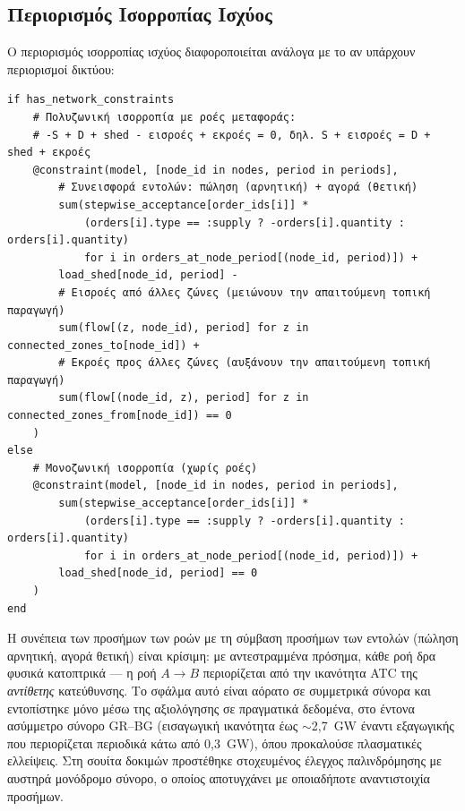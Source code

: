\subsection{Περιορισμός Ισορροπίας Ισχύος}
\label{subsec:mpcc-power-balance}

Ο περιορισμός ισορροπίας ισχύος διαφοροποιείται ανάλογα με το αν υπάρχουν περιορισμοί δικτύου:

\begin{samepage}
\begin{verbatim}
if has_network_constraints
    # Πολυζωνική ισορροπία με ροές μεταφοράς:
    # -S + D + shed - εισροές + εκροές = 0, δηλ. S + εισροές = D + shed + εκροές
    @constraint(model, [node_id in nodes, period in periods],
        # Συνεισφορά εντολών: πώληση (αρνητική) + αγορά (θετική)
        sum(stepwise_acceptance[order_ids[i]] *
            (orders[i].type == :supply ? -orders[i].quantity : orders[i].quantity)
            for i in orders_at_node_period[(node_id, period)]) +
        load_shed[node_id, period] -
        # Εισροές από άλλες ζώνες (μειώνουν την απαιτούμενη τοπική παραγωγή)
        sum(flow[(z, node_id), period] for z in connected_zones_to[node_id]) +
        # Εκροές προς άλλες ζώνες (αυξάνουν την απαιτούμενη τοπική παραγωγή)
        sum(flow[(node_id, z), period] for z in connected_zones_from[node_id]) == 0
    )
else
    # Μονοζωνική ισορροπία (χωρίς ροές)
    @constraint(model, [node_id in nodes, period in periods],
        sum(stepwise_acceptance[order_ids[i]] *
            (orders[i].type == :supply ? -orders[i].quantity : orders[i].quantity)
            for i in orders_at_node_period[(node_id, period)]) +
        load_shed[node_id, period] == 0
    )
end
\end{verbatim}
\end{samepage}

Η συνέπεια των προσήμων των ροών με τη σύμβαση προσήμων των εντολών (πώληση αρνητική, αγορά θετική) είναι κρίσιμη: με αντεστραμμένα πρόσημα, κάθε ροή δρα φυσικά κατοπτρικά --- η ροή $A \to B$ περιορίζεται από την ικανότητα ATC της \emph{αντίθετης} κατεύθυνσης. Το σφάλμα αυτό είναι αόρατο σε συμμετρικά σύνορα και εντοπίστηκε μόνο μέσω της αξιολόγησης σε πραγματικά δεδομένα, στο έντονα ασύμμετρο σύνορο GR--BG (εισαγωγική ικανότητα έως $\sim$2,7~GW έναντι εξαγωγικής που περιορίζεται περιοδικά κάτω από 0,3~GW), όπου προκαλούσε πλασματικές ελλείψεις. Στη σουίτα δοκιμών προστέθηκε στοχευμένος έλεγχος παλινδρόμησης με αυστηρά μονόδρομο σύνορο, ο οποίος αποτυγχάνει με οποιαδήποτε αναντιστοιχία προσήμων.


